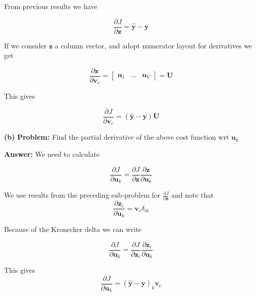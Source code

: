 \documentclass[11pt]{article}
\renewcommand\part[1]{\vspace{.10in}\textbf{(#1)}}
\newcommand\problem{\vspace{.10in}\textbf{Problem: }}
\newcommand\answer{\vspace{.10in}\textbf{Answer: }}
\begin{document}
From previous results we have 

\begin{equation}
  \frac{\partial J}{\partial \bm{z}} = \bm{\hat{y}} - \bm{y}
\end{equation}

If we consider $\bm{z}$ a column vector, and adopt numerator layout for derivatives we get 

\begin{equation}
  \frac{\partial\bm{z}}{\partial \bm{v}_c} = \begin{bmatrix} \bm{u}_1 & ... &  \bm{u}_V\end{bmatrix} = \bm{U} 
\end{equation}

This gives 

\begin{equation}
  \frac{\partial J}{\partial \bm{v}_c} = (\bm{\hat{y}} - \bm{y})\bm{U}
\end{equation}

\part{b} \problem Find the partial derivative of the above cost function wrt $\bm{u}_k$

\answer We need to calculate

\begin{equation}
  \frac{\partial J}{\partial \bm{u}_k} =  \frac{\partial J}{\partial \bm{z}}\frac{\partial\bm{z}}{\partial \bm{u}_k}
\end{equation}

We use results from the preceding sub-problem for $\frac{\partial J}{\partial \bm{z}}$ and note that 
\begin{equation}
  \frac{\partial\bm{z}_i}{\partial \bm{u}_k}  = \bm{v}_c\delta_{ik}
\end{equation}

Because of the Kronecker delta we can write 

\begin{equation}
  \frac{\partial J}{\partial \bm{u}_k} =  \frac{\partial J}{\partial \bm{z}_i}\frac{\partial\bm{z}_i}{\partial \bm{u}_k}
\end{equation}

This gives 
\begin{equation}
  \frac{\partial J}{\partial \bm{u}_k} = (\bm{\hat{y}} - \bm{y})_k\bm{v}_c
\end{equation}

%
\end{document}
